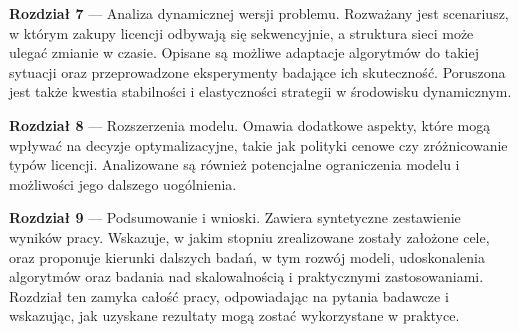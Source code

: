 \begin{description}
    \item \textbf{Rozdział 7} --- Analiza dynamicznej wersji problemu. Rozważany jest scenariusz, w którym zakupy licencji odbywają się sekwencyjnie, a struktura sieci może ulegać zmianie w czasie. Opisane są możliwe adaptacje algorytmów do takiej sytuacji oraz przeprowadzone eksperymenty badające ich skuteczność. Poruszona jest także kwestia stabilności i elastyczności strategii w środowisku dynamicznym.
    
    \item \textbf{Rozdział 8} --- Rozszerzenia modelu. Omawia dodatkowe aspekty, które mogą wpływać na decyzje optymalizacyjne, takie jak polityki cenowe czy zróżnicowanie typów licencji. Analizowane są również potencjalne ograniczenia modelu i możliwości jego dalszego uogólnienia.
    
    \item \textbf{Rozdział 9} --- Podsumowanie i wnioski. Zawiera syntetyczne zestawienie wyników pracy. Wskazuje, w jakim stopniu zrealizowane zostały założone cele, oraz proponuje kierunki dalszych badań, w tym rozwój modeli, udoskonalenia algorytmów oraz badania nad skalowalnością i praktycznymi zastosowaniami. Rozdział ten zamyka całość pracy, odpowiadając na pytania badawcze i wskazując, jak uzyskane rezultaty mogą zostać wykorzystane w praktyce.
\end{description}

